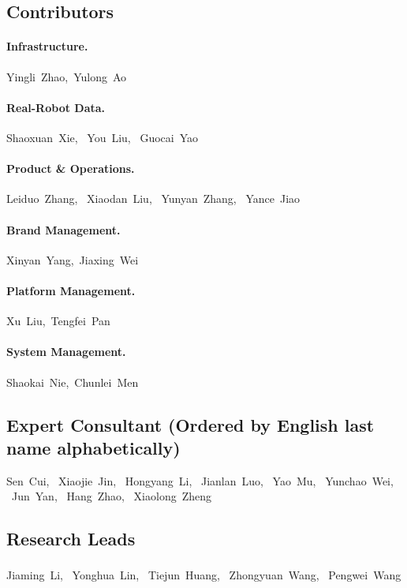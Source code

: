 \subsection{Contributors} 

\paragraph{Infrastructure.}
Yingli~Zhao,\
Yulong~Ao

\paragraph{Real-Robot Data.}
Shaoxuan~Xie, \
You~Liu, \
Guocai~Yao

\paragraph{Product \& Operations.}
Leiduo~Zhang, \
Xiaodan~Liu, \
Yunyan~Zhang, \
Yance~Jiao

\paragraph{Brand Management.}
Xinyan~Yang,\
Jiaxing~Wei

\paragraph{Platform Management.}
Xu~Liu,\
Tengfei~Pan

\paragraph{System Management.}
Shaokai~Nie,\
Chunlei~Men


\subsection{Expert Consultant (Ordered by English last name alphabetically)}
Sen~Cui, \
Xiaojie~Jin, \
Hongyang~Li, \
Jianlan~Luo, \
Yao~Mu, \
Yunchao~Wei, \
Jun~Yan, \
Hang~Zhao, \
Xiaolong~Zheng


\subsection{Research Leads}
Jiaming~Li, \ 
Yonghua~Lin, \ 
Tiejun~Huang, \ 
Zhongyuan~Wang\textsuperscript{\Letter}, \ 
Pengwei~Wang\textsuperscript{\Letter}

\vspace{5ex}


\makeatletter
\begingroup
  \renewcommand{\thefootnote}{}
  \renewcommand{\@makefntext}[1]{\noindent #1}
\endgroup
\makeatother
